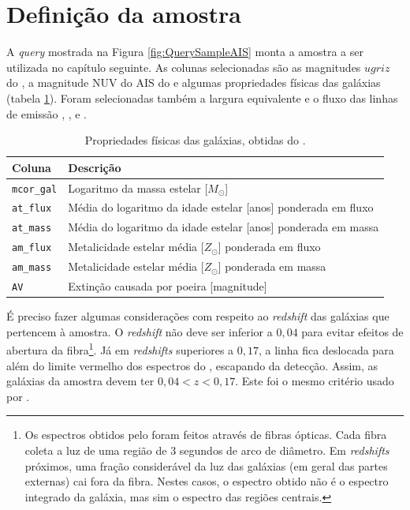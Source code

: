 
\section{Definição da amostra \STARLIGHTUV}
\label{sec:Crossmatch:DefAmostras:StarlightUV}

A {\em query} mostrada na Figura \ref{fig:QuerySampleAIS} monta a amostra a ser
utilizada no capítulo seguinte. As colunas selecionadas são as magnitudes
$ugriz$ do \SDSS, a magnitude NUV do AIS do \galex e algumas propriedades
físicas das galáxias (tabela \ref{tab:ParamFisicos}). Foram selecionadas também
a largura equivalente e o fluxo das linhas de emissão \Halpha, \Hbeta, \OIII e
\NII.

\begin{table}
	\caption[Propriedades físicas das galáxias utilizados na amostra.]
	{Propriedades físicas das galáxias, obtidas do \starlight.}
	\begin{tabular}{l l}
		Coluna & Descrição \\
		\midrule
		\texttt{mcor\_gal} &
		Logaritmo da massa estelar [$M_{\odot}$]
		\\
		\texttt{at\_flux} &
		Média do logaritmo da idade estelar [anos] ponderada em
		fluxo
		\\
		\texttt{at\_mass} &
		Média do logaritmo da idade estelar [anos] ponderada em
		massa
		 \\
		 \texttt{am\_flux} &
		 Metalicidade estelar média [$Z_{\odot}$] ponderada em fluxo
		 \\
		\texttt{am\_mass} &
		Metalicidade estelar média [$Z_{\odot}$] ponderada em massa
		\\
		\texttt{AV} &
		Extinção causada por poeira [magnitude]
		\\
	\end{tabular}
	\label{tab:ParamFisicos}
\end{table}

É preciso fazer algumas  considerações com respeito ao {\em redshift} das
galáxias que pertencem à amostra. O {\em redshift} não deve ser inferior a
$0,04$ para evitar efeitos de abertura da fibra\footnote{Os espectros obtidos
pelo \SDSS foram feitos através de fibras ópticas. Cada fibra coleta a luz de
uma região de 3 segundos de arco de diâmetro. Em {\em redshifts} próximos, uma
fração considerável da luz das galáxias (em geral das partes externas) cai fora
da fibra. Nestes casos, o espectro obtido não é o espectro integrado da galáxia,
mas sim o espectro das regiões centrais.}. Já em {\em redshifts} superiores a
$0,17$, a linha \NII fica deslocada para além do limite vermelho dos espectros
do \SDSS, escapando da detecção. Assim, as galáxias da amostra devem ter $0,04 <
z < 0,17$. Este foi o mesmo critério usado por \citet{CidFernandes2011}.

